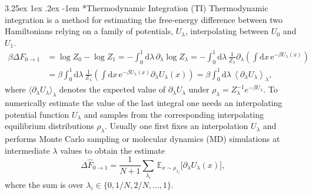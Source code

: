 \documentclass[%
onecolumn,
superscriptaddress,
nofootinbib,
amsmath,amssymb,
table
]{revtex4-2}
\makeatletter
\renewcommand\paragraph{%
  \@startsection{paragraph}{4}{\z@}%
    {3.25ex \@plus1ex \@minus.2ex}%
    {-1em}%
    {\normalfont\normalsize\bfseries}%
}
\makeatother
\begin{document}
\paragraph*{Thermodynamic Integration (TI)}
Thermodynamic integration \citep{kirkwood1935statistical} is a method for estimating the free-energy difference between two Hamiltonians relying on a family of potentials, $U_\lambda$, interpolating between $U_0$ and $U_1$.
{\allowdisplaybreaks
\begin{align}
    \beta \Delta F_{0\rightarrow 1}
    &=\log Z_0-\log Z_1 
    = -\int_0^1 \text{d}\lambda \, \partial_\lambda \log Z_\lambda  =  -\int_0^1 \text{d}\lambda \, \frac{1}{Z_\lambda}\partial_\lambda\left(\int \text{d}x \, \text{e}^{-\beta U_\lambda(x)}\right) \\
     &=  \beta\int_0^1 \text{d}\lambda \, \frac{1}{Z_\lambda}\left(\int \text{d}x \, \text{e}^{-\beta U_\lambda(x)} \partial_\lambda U_\lambda(x)\right) =  \beta \int_0^1 \text{d}\lambda \, \left\langle  \partial_\lambda U_\lambda \right\rangle_\lambda, \label{eq_TI} 
\end{align}}
where $\langle\partial_\lambda U_\lambda \rangle_\lambda$ denotes the expected value of $\partial_\lambda U_\lambda$ under $\rho_\lambda = Z_\lambda^{-1}e^{-\beta U_\lambda}$. To numerically estimate the value of the last integral one needs an interpolating potential function $U_\lambda$ and samples from the corresponding interpolating equilibrium distributions $\rho_\lambda$. Usually one first fixes an interpolation $U_\lambda$ and performs Monte Carlo sampling or molecular dynamics (MD) simulations  at intermediate $\lambda$ values to obtain the estimate
\begin{equation}
    \Delta \hat F_{0\rightarrow 1} = \frac{1}{N+1}\sum_{\lambda_i} \, \mathbb E_{x\sim \rho_{\lambda _i}}\big[  \partial_\lambda U_\lambda(x)\big],
\end{equation}
where the sum is over $\lambda_i \in \{0,1/N,2/N,...,1\}$.
\end{document}
